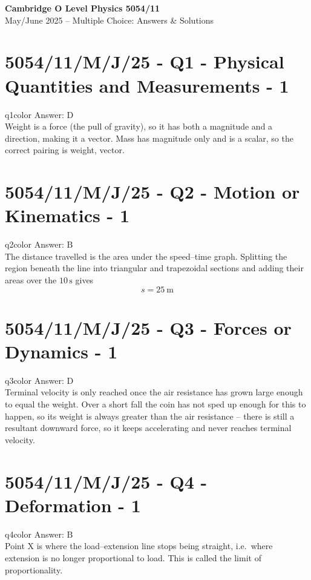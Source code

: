 \documentclass[11pt,a4paper]{article}
\newcommand{\examq}[4]{\section[#1 - Q#2]{#1 - Q#2 - #3 - #4}}
\begin{document}
\begin{center}
  {\LARGE \textbf{Cambridge O Level Physics 5054/11}}\\[6pt]
  {\large May/June 2025 -- Multiple Choice: Answers \& Solutions}
\end{center}

\bigskip

\examq{5054/11/M/J/25}{1}{Physical Quantities and Measurements}{1}

\begin{ansbox}{q1color}
Answer: $\boxed{\text{D}}$\\[4pt]
Weight is a force (the pull of gravity), so it has both a magnitude and a direction, making it a vector. Mass has magnitude only and is a scalar, so the correct pairing is weight, vector.
\end{ansbox}

\examq{5054/11/M/J/25}{2}{Motion or Kinematics}{1}

\begin{ansbox}{q2color}
Answer: $\boxed{\text{B}}$\\[4pt]
The distance travelled is the area under the speed--time graph. Splitting the region beneath the line into triangular and trapezoidal sections and adding their areas over the $10\,\mathrm{s}$ gives
\[
s = \boxed{25\ \mathrm{m}}
\]
\end{ansbox}

\examq{5054/11/M/J/25}{3}{Forces or Dynamics}{1}

\begin{ansbox}{q3color}
Answer: $\boxed{\text{D}}$\\[4pt]
Terminal velocity is only reached once the air resistance has grown large enough to equal the weight. Over a short fall the coin has not sped up enough for this to happen, so its weight is always greater than the air resistance -- there is still a resultant downward force, so it keeps accelerating and never reaches terminal velocity.
\end{ansbox}

\examq{5054/11/M/J/25}{4}{Deformation}{1}

\begin{ansbox}{q4color}
Answer: $\boxed{\text{B}}$\\[4pt]
Point X is where the load--extension line stops being straight, i.e.\ where extension is no longer proportional to load. This is called the limit of proportionality.
\end{ansbox}
\end{document}
